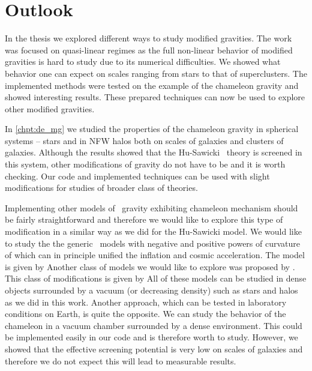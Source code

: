 \chapter{Outlook}
\label{chpt:outlook}
In the thesis we explored different ways to study modified gravities. The work was focused on quasi-linear regimes as the full non-linear behavior of modified gravities is hard to study due to its numerical difficulties. We showed what behavior one can expect on scales ranging from stars to that of superclusters. The implemented methods were tested on the example of the chameleon gravity and showed interesting results. These prepared techniques can now be used to explore other modified gravities.

In \autoref{chpt:de_mg} we studied the properties of the chameleon gravity in spherical systems -- stars and in NFW halos both on scales of galaxies and clusters of galaxies. Although the results showed that the Hu-Sawicki \fR\ theory is screened in this system, other modifications of gravity do not have to be and it is worth checking. Our code and implemented techniques can be used with slight modifications for studies of broader class of theories.

Implementing other models of \fR\ gravity exhibiting chameleon mechanism should be fairly straightforward and therefore we would like to explore this type of modification in a similar way as we did for the Hu-Sawicki model. We would like to study the the generic \fR\ models with negative and positive powers of curvature of \textcite{2003PhRvD..68l3512N} which can in principle unified the inflation and cosmic acceleration. The model is given by
Another class of models we would like to explore was proposed by \textcite{2007JETPL..86..157S}. This class of modifications is given by
All of these models can be studied in dense objects surrounded by a vacuum (or decreasing density) such as stars and halos as we did in this work. Another approach, which can be tested in laboratory conditions on Earth, is quite the opposite. We can study the behavior of the chameleon in a vacuum chamber surrounded by a dense environment. This could be implemented easily in our code and is therefore worth to study. However, we showed that the effective screening potential is very low on scales of galaxies and therefore we do not expect this will lead to measurable results.

